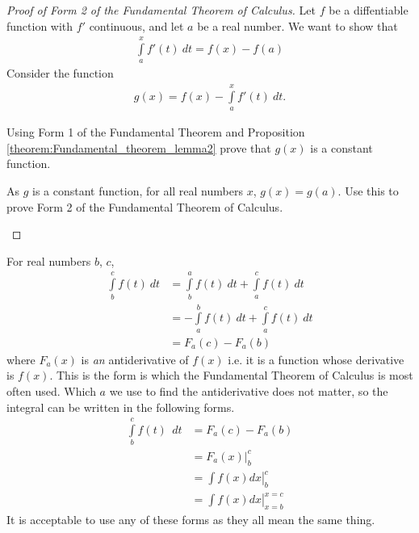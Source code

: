 \begin{proof}[Proof of Form 2 of the Fundamental Theorem of Calculus]
	Let $f$ be a diffentiable function with $f'$ continuous, and let $a$ be a real number. We want to show that
	\begin{align*}
		\int \limits_a^x f'(t) \:dt = f(x) - f(a)
	\end{align*}
	Consider the function
	\begin{align*}
		g(x) = f(x) - \int \limits_a^x f'(t) \:dt.
	\end{align*}
	\begin{exercise}
		Using Form 1 of the Fundamental Theorem and Proposition \ref{theorem:Fundamental_theorem_lemma2} prove that $g(x)$ is a constant function.
	\end{exercise}
	\begin{exercise}
		As $g$ is a constant function, for all real numbers $x$, $g(x) = g(a)$. Use this to prove Form 2 of the Fundamental Theorem of Calculus.
	\end{exercise}
\end{proof}

\begin{remark}
	For real numbers $b$, $c$,
		\begin{align*}
			\int \limits_b^c f(t) \:dt
			&= \int \limits_b^a f(t) \:dt + \int \limits_a^c f(t) \:dt\\
			&= -\int \limits_a^b f(t) \:dt + \int \limits_a^c f(t) \:dt\\
			&= F_a(c) - F_a(b)
		\end{align*}
	where $F_a(x)$ is {\it an} antiderivative of $f(x)$ i.e. it is a function whose derivative is $f(x)$. This is the form is which the Fundamental Theorem of Calculus is most often used. Which $a$ we use to find the antiderivative does not matter, so the integral can be written in the following forms.
	\begin{align*}
		\int \limits_b^c f(t) \: \:dt
		&= F_a(c) - F_a(b) \\
		&= \left. F_a(x) \right|_{b}^c \\
		&= \left. \int f(x) dx \right|_{b}^c \\
		&= \left. \int f(x) dx \right|_{x=b}^{x=c}
	\end{align*}
	It is acceptable to use any of these forms as they all mean the same thing.
\end{remark}

\newpage
